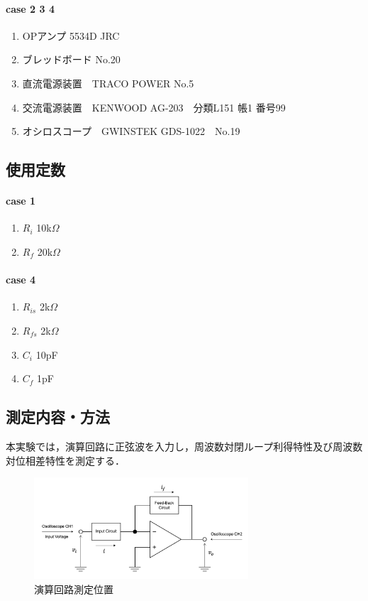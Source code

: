 \documentclass[dvipdfmx,titlepage,a4j]{jsarticle}  %
\begin{document}
\paragraph{case 2 3 4}
\begin{enumerate}
  \item OPアンプ 5534D JRC
  \item ブレッドボード No.20
  \item 直流電源装置　TRACO POWER No.5
  \item 交流電源装置　KENWOOD AG-203　分類L151 帳1 番号99
  \item オシロスコープ　GWINSTEK GDS-1022　No.19
\end{enumerate}

\subsection{使用定数}
\paragraph{case 1}
\begin{enumerate}
  \item $R_i$ 10k$\Omega$
  \item $R_f$ 20k$\Omega$
\end{enumerate}

\paragraph{case 4}
\begin{enumerate}
  \item $R_{is}$ 2k$\Omega$
  \item $R_{fs}$ 2k$\Omega$
  \item $C_{i}$ 10pF
  \item $C_{f}$ 1pF
\end{enumerate}

\subsection{測定内容・方法}
本実験では，演算回路に正弦波を入力し，周波数対閉ループ利得特性及び周波数対位相差特性を測定する．

\begin{figure}[H]
  \begin{center}
      \includegraphics[width=8cm]{../image/dia-o.png}
      \caption{演算回路測定位置}
      \label{fig:di:o}
  \end{center}
\end{figure}
\end{document}
